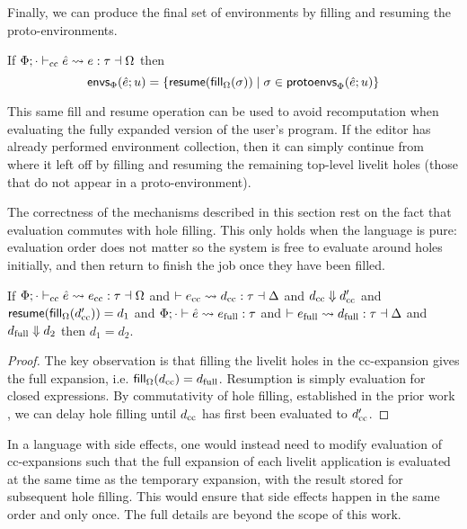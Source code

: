 Finally, we can produce the final set of environments by filling and resuming the proto-environments.
\begin{definition}
    If $\Phi; \cdot \vdash_\text{cc} \hat e \leadsto e : \tau \dashv \Omega$
    then \[\mathsf{envs}_{\Phi}(\hat e; u) = \{\mathsf{resume}(\mathsf{fill}_{\Omega}(\sigma)) \mid \sigma \in \mathsf{protoenvs}_{\Phi}(\hat e; u)\}\]
\end{definition}

This same fill and resume operation can be used to avoid recomputation when evaluating the fully expanded version of the user's program.
If the editor has already performed environment collection, then it can simply continue from where it left off
by filling and resuming
the remaining top-level livelit holes (those that do not appear in a proto-environment).

The correctness of the mechanisms described in this section rest on the fact that evaluation commutes with hole filling. 
This only holds when the language is pure: evaluation order does not matter 
so the system is free to evaluate around holes initially, 
and then return to finish the job once they have been filled. 

\begin{theorem}
    If $\Phi; \cdot \vdash_\text{cc} \hat e \leadsto e_\text{cc} : \tau \dashv \Omega$ and $\vdash e_\text{cc} \leadsto d_\text{cc} : \tau \dashv \Delta$
    and $d_\text{cc} \Downarrow d_\text{cc}'$ and $\mathsf{resume}(\mathsf{fill}_{\Omega}(d_\text{cc}')) = d_1$ 
    and $\Phi; \cdot \vdash \hat e \leadsto e_\text{full} : \tau$
    and $\vdash e_\text{full} \leadsto d_\text{full} : \tau \dashv \Delta$ 
    and $d_\text{full} \Downarrow d_2$ then $d_1 = d_2$.
\end{theorem}
\begin{proof}
    The key observation is that filling the livelit holes in the cc-expansion gives the full expansion,
    i.e. $\mathsf{fill}_{\Omega}(d_\text{cc}) = d_\text{full}$. Resumption is simply evaluation for closed expressions.
    By commutativity of hole filling, established in the prior work \cite{HazelnutLive}, 
    we can delay hole filling until $d_\text{cc}$ has first been evaluated to
    $d_\text{cc}'$.
\end{proof}

In a language with side effects, one would instead need to modify evaluation of  
cc-expansions such that the full expansion of each livelit application is evaluated at the same time as the 
temporary expansion,
with the result stored for subsequent hole filling. This would ensure that
side effects happen in the same order and only once. The full details are beyond the scope of this work.

